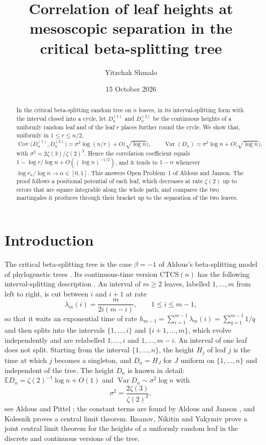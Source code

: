 \documentclass[11pt]{amsart}
\title[Leaf heights at mesoscopic separation]{Correlation of leaf heights at mesoscopic separation in the critical beta-splitting tree}
\author{Yitzchak Shmalo}
\date{15 October 2026}
\theoremstyle{remark}
\numberwithin{equation}{section}
\newcommand{\E}{\mathbb E}
\newcommand{\Var}{\operatorname{Var}}
\newcommand{\Cov}{\operatorname{Cov}}
\begin{document}
\begin{abstract}
In the critical beta-splitting random tree on $n$ leaves, in its interval-splitting form with the interval closed into a cycle, let $D^{(1)}_n$ and $D^{(2)}_n$ be the continuous heights of a uniformly random leaf and of the leaf $r$ places further round the cycle. We show that, uniformly in $1\le r\le n/2$,
\[
\Cov\bigl(D^{(1)}_n,D^{(2)}_n\bigr)=\sigma^2\log(n/r)+O\bigl(\sqrt{\log n}\bigr),\qquad \Var(D_n)=\sigma^2\log n+O\bigl(\sqrt{\log n}\bigr),
\]
with $\sigma^2=2\zeta(3)/\zeta(2)^3$. Hence the correlation coefficient equals $1-\log r/\log n+O((\log n)^{-1/2})$, and it tends to $1-\alpha$ whenever $\log r_n/\log n\to\alpha\in[0,1]$. This answers Open Problem~1 of Aldous and Janson. The proof follows a positional potential of each leaf, which decreases at rate $\zeta(2)$ up to errors that are square integrable along the whole path, and compares the two martingales it produces through their bracket up to the separation of the two leaves.
\end{abstract}
\maketitle

\section{Introduction}\label{sec:intro}

The critical beta-splitting tree is the case $\beta=-1$ of Aldous's beta-splitting model of phylogenetic trees \cite{Ald96}. Its continuous-time version $\mathrm{CTCS}(n)$ has the following interval-splitting description \cite{AJ,AP}. An interval of $m\ge2$ leaves, labelled $1,\dots,m$ from left to right, is cut between $i$ and $i+1$ at rate
\begin{equation}\label{eq:rate}
\lambda_m(i)=\frac{m}{2i(m-i)},\qquad 1\le i\le m-1,
\end{equation}
so that it waits an exponential time of rate $h_{m-1}=\sum_{i=1}^{m-1}\lambda_m(i)=\sum_{q=1}^{m-1}1/q$ and then splits into the intervals $\{1,\dots,i\}$ and $\{i+1,\dots,m\}$, which evolve independently and are relabelled $1,\dots,i$ and $1,\dots,m-i$. An interval of one leaf does not split. Starting from the interval $\{1,\dots,n\}$, the height $H_j$ of leaf $j$ is the time at which $j$ becomes a singleton, and $D_n=H_J$ for $J$ uniform on $\{1,\dots,n\}$ and independent of the tree. The height $D_n$ is known in detail: $\E D_n=\zeta(2)^{-1}\log n+O(1)$ and $\Var D_n\sim\sigma^2\log n$ with
\[
\sigma^2=\frac{2\zeta(3)}{\zeta(2)^3},
\]
see Aldous and Pittel \cite[Theorem~1.1]{AP}; the constant terms are found by Aldous and Janson \cite{AJ4}, and Kolesnik \cite{Kol} proves a central limit theorem. Iksanov, Nikitin and Yakymiv \cite{INY} prove a joint central limit theorem for the heights of a uniformly random leaf in the discrete and continuous versions of the tree.
\end{document}
